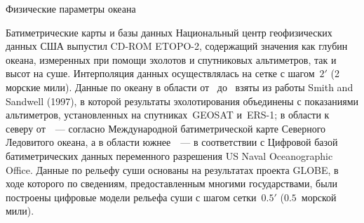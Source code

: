 \begin{chapter}{Физические параметры океана}
\begin{section}{Батиметрические карты и базы данных}
Национальный центр геофизических данных США выпустил CD-ROM
ETOPO-2, содержащий значения как глубин океана, измеренных при помощи эхолотов
и спутниковых альтиметров, так и высот на суше.
Интерполяция данных осуществлялась на сетке с шагом~$2'$ (2 морские мили).
Данные по океану в области от~ до~ взяты из
работы Smith and Sandwell (1997), в которой результаты эхолотирования
объединены с показаниями альтиметров, установленных на спутниках~GEOSAT
и~ERS-1; в области к северу от~~--- согласно Международной
батиметрической карте Северного Ледовитого океана, а в области 
южнее~~--- в соответствии с Цифровой базой батиметрических
данных переменного разрешения US Naval Oceanographic Office.
Данные по рельефу суши основаны на результатах проекта GLOBE, в ходе которого 
по сведениям, предоставленным многими государствами, были построены
цифровые модели рельефа суши с шагом сетки~$0.5'$ ($0.5$~морской мили).
%


\end{section}
\end{chapter}
